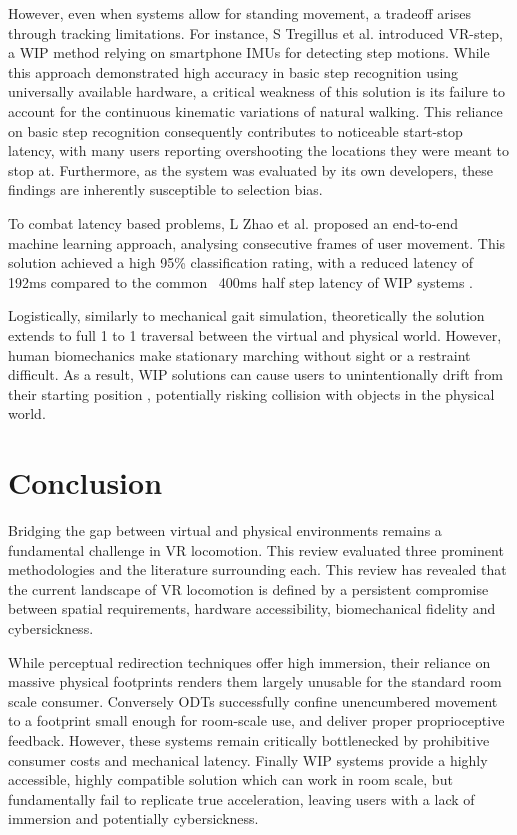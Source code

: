 \documentclass[conference]{IEEEtran}  %
\begin{document}
However, even when systems allow for standing movement, a tradeoff arises through tracking limitations. For instance, S Tregillus et al. \cite{tregillus2016vr} introduced VR-step, a WIP method relying on smartphone IMUs for detecting step motions. While this approach demonstrated high accuracy in basic step recognition using universally available hardware, a critical weakness of this solution is its failure to account for the continuous kinematic variations of natural walking. This reliance on basic step recognition consequently contributes to noticeable start-stop latency, with many users reporting overshooting the locations they were meant to stop at. Furthermore, as the system was evaluated by its own developers, these findings are inherently susceptible to selection bias. 

To combat latency based problems, L Zhao et al. \cite{zhao2021classifying} proposed an end-to-end machine learning approach, analysing consecutive frames of user movement. This solution achieved a high 95\% classification rating, with a reduced            latency of 192ms compared to the common ~400ms half step latency of WIP systems \cite{tregillus2016vr}.

Logistically, similarly to mechanical gait simulation, theoretically the solution extends to full 1 to 1 traversal between the virtual and physical world. However, human biomechanics make stationary marching without sight or a restraint difficult. As a result, WIP solutions can cause users to unintentionally drift from their starting position \cite{nilsson2014comparison}, potentially risking collision with objects in the physical world.

\section{Conclusion} %
Bridging the gap between virtual and physical environments remains a fundamental challenge in VR locomotion. This review evaluated three prominent methodologies and the literature surrounding each. This review has revealed that the current landscape of VR locomotion is defined by a persistent compromise between spatial requirements, hardware accessibility, biomechanical fidelity and cybersickness. 

While perceptual redirection techniques offer high immersion, their reliance on massive physical footprints renders them largely unusable for the standard room scale consumer. Conversely ODTs successfully confine unencumbered movement to a footprint small enough for room-scale use, and deliver proper proprioceptive feedback. However, these systems remain critically bottlenecked by prohibitive consumer costs and mechanical latency. Finally WIP systems provide a highly accessible, highly compatible solution which can work in room scale, but fundamentally fail to replicate true acceleration, leaving users with a lack of immersion and potentially cybersickness.
\end{document}
